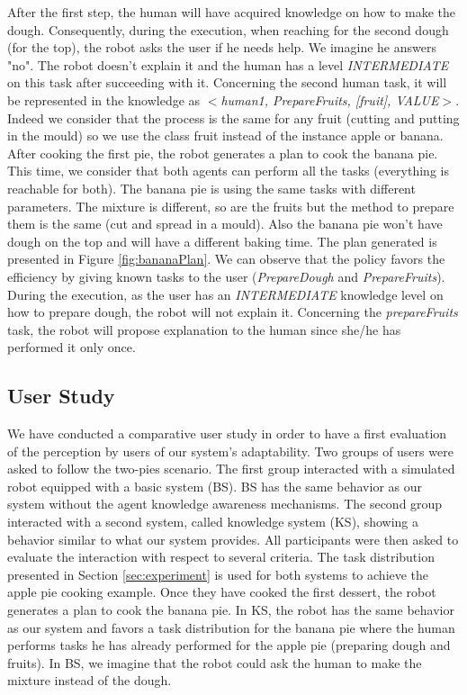 After the first step, the human will have acquired knowledge on how to make the dough.
Consequently, during the execution, when reaching for the second dough (for the top), the robot asks the user if he needs help. We imagine he answers "no". The robot doesn't explain it and the human has a level \textit{INTERMEDIATE} on this task after succeeding with it. Concerning the second human task, it will be represented in the knowledge as \textit{$<$human1, PrepareFruits, [fruit], VALUE$>$}. Indeed we consider that the process is the same for any fruit (cutting and putting in the mould) so we use the class fruit instead of the instance apple or banana.
%
%
After cooking the first pie, the robot generates a plan to cook the banana pie. This time, we consider that both agents can perform all the tasks (everything is reachable for both). The banana pie is using the same tasks with different parameters. The  mixture is different, so are the fruits but the method to prepare them is the same (cut and spread in a mould). Also the banana pie won't have dough on the top and will have a different baking time. The plan generated is presented in Figure \ref{fig:bananaPlan}. We can observe that the policy favors the efficiency by giving known tasks to the user (\textit{PrepareDough} and \textit{PrepareFruits}). During the execution, as the user has an \textit{INTERMEDIATE} knowledge level on how to prepare dough, the robot will not explain it. Concerning the \textit{prepareFruits} task, the robot will propose explanation to the human since she/he has performed it only once.


\subsection{User Study}
We have conducted a comparative user study in order to have a first evaluation of the perception by users of our system's adaptability. Two groups of users were asked to follow the two-pies scenario. The first group interacted with a simulated robot equipped with a basic system (BS). BS has the same behavior as our system without the agent knowledge awareness mechanisms. The second group interacted with a second system, called knowledge system (KS), showing a behavior similar to what our system provides.
All participants were then asked to evaluate the interaction with respect to several criteria.
%
The task distribution presented in Section \ref{sec:experiment} 
is used for both systems to achieve the apple pie cooking example.
Once they have cooked the first dessert, the robot generates a plan to cook the banana pie. 
In KS,  the robot has the same behavior as our system and  favors a task distribution for the banana pie where the human performs tasks he has already performed for the apple pie (preparing dough and fruits).
In BS, we imagine that the robot could ask the human to make the mixture instead of the dough.

